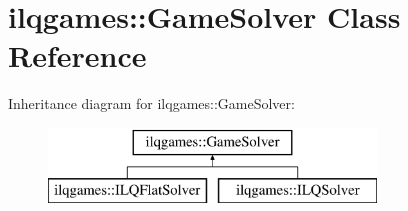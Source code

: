 \hypertarget{classilqgames_1_1_game_solver}{}\section{ilqgames\+:\+:Game\+Solver Class Reference}
\label{classilqgames_1_1_game_solver}
Inheritance diagram for ilqgames\+:\+:Game\+Solver\+:\begin{figure}[H]
\begin{center}
\leavevmode
\includegraphics[height=2.000000cm]{classilqgames_1_1_game_solver}
\end{center}
\end{figure}
